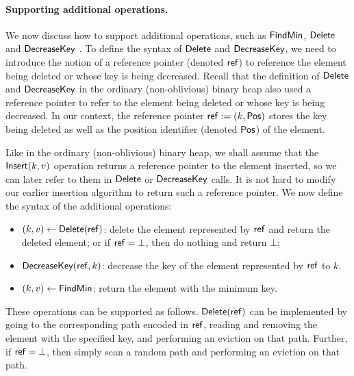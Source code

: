 \documentclass[11pt]{article}
\begin{document}
\paragraph{Supporting additional operations.}
We now discuss how to support 
additional operations, such as
${\sf FindMin}$, ${\sf Delete}$ and ${\sf DecreaseKey}$ . 
To define the syntax of ${\sf Delete}$ and ${\sf DecreaseKey}$, 
we need to introduce
the notion of a reference pointer (denoted ${\sf ref}$) 
to reference 
the element being deleted or whose key is being decreased. 
Recall that   
the definition of ${\sf Delete}$ and ${\sf DecreaseKey}$ in the ordinary (non-oblivious)
binary heap also used a reference pointer to refer to the element
being deleted or whose key is being decreased. 
In our context, the reference pointer ${\sf ref} := (k, {\sf Pos})$
stores the key being deleted as well as the position identifier
(denoted ${\sf Pos}$)
of the element.  
 
Like in the ordinary (non-oblivious) binary heap, we shall assume that 
the ${\sf Insert}(k, v)$
operation returns a reference pointer 
to the element inserted, so we can later refer to them
in ${\sf Delete}$ or ${\sf DecreaseKey}$ calls. 
It is not hard to modify our earlier insertion algorithm
to return such a reference pointer. 
We now define the syntax of the additional operations: 
\begin{itemize}
    \item $(k, v) \leftarrow {\sf Delete}({\sf ref})$: 
delete the element represented
by ${\sf ref}$ and return the deleted element; 
or if ${\sf ref} = \bot$, then do nothing and return $\bot$;  
    \item ${\sf DecreaseKey}({\sf ref}, k)$: %
decrease the key of the element 
represented by ${\sf ref}$ to $k$. 
\item $(k, v)\leftarrow {\sf FindMin}$:
return the element with the minimum key.
\end{itemize}

These operations can be supported as follows. 
${\sf Delete}({\sf ref})$ can be implemented by going to the corresponding path 
encoded in ${\sf ref}$, reading and removing the element with the specified key, 
and performing an eviction on that path. Further, if ${\sf ref} = \bot$, then
simply scan a random path  
and performing an eviction on that path.
\end{document}
